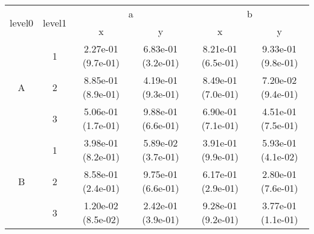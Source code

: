 \begin{tabular}{cccccc}
\toprule
\multirow{2}{*}{level0} & \multirow{2}{*}{level1}&\multicolumn{2}{c}{a}&\multicolumn{2}{c}{b}\tabularnewline
\cmidrule(lr){3-4}
\cmidrule(lr){5-6}
&&x&y&x&y\tabularnewline
\midrule
\multirow{3}{*}{A}&1& 2.27e-01 (9.7e-01)& 6.83e-01 (3.2e-01)& 8.21e-01 (6.5e-01)& 9.33e-01 (9.8e-01)\tabularnewline
&2& 8.85e-01 (8.9e-01)& 4.19e-01 (9.3e-01)& 8.49e-01 (7.0e-01)& 7.20e-02 (9.4e-01)\tabularnewline
&3& 5.06e-01 (1.7e-01)& 9.88e-01 (6.6e-01)& 6.90e-01 (7.1e-01)& 4.51e-01 (7.5e-01)\tabularnewline
\midrule
\multirow{3}{*}{B}&1& 3.98e-01 (8.2e-01)& 5.89e-02 (3.7e-01)& 3.91e-01 (9.9e-01)& 5.93e-01 (4.1e-02)\tabularnewline
&2& 8.58e-01 (2.4e-01)& 9.75e-01 (6.6e-01)& 6.17e-01 (2.9e-01)& 2.80e-01 (7.6e-01)\tabularnewline
&3& 1.20e-02 (8.5e-02)& 2.42e-01 (3.9e-01)& 9.28e-01 (9.2e-01)& 3.77e-01 (1.1e-01)\tabularnewline
\bottomrule
\end{tabular}
